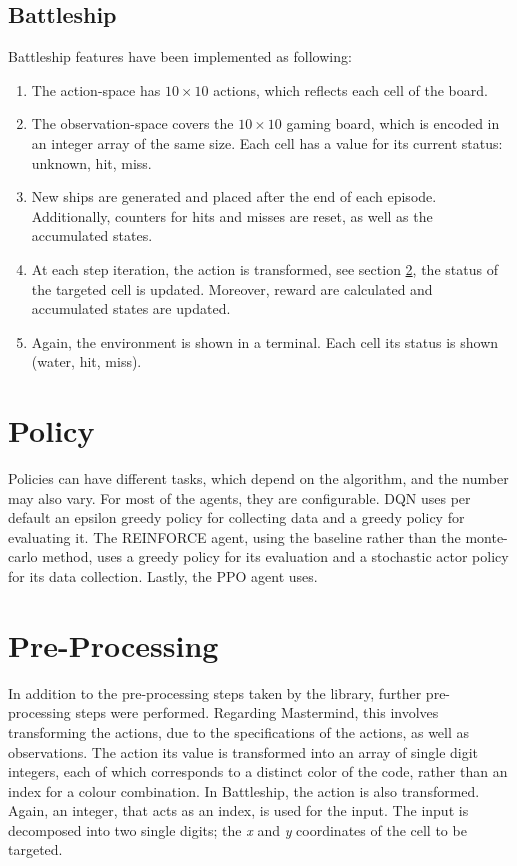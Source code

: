 \subsection{Battleship}
\label{ssec:Battleship}
Battleship features have been implemented as following:

\begin{enumerate}

	\item{The action-space has $10 \times 10$ actions, which reflects each cell of the board.}
	\item{The observation-space covers the $10 \times 10$ gaming board, which is encoded in an integer array of the same size. Each cell has a value for its current status: unknown, hit, miss. }
	\item{New ships are generated and placed after the end of each episode. Additionally, counters for hits and misses are reset, as well as the accumulated states.}
	\item{At each step iteration, the action is transformed, see section \ref{sec:preprocessing}, the status of the targeted cell is updated. Moreover, reward are calculated and accumulated states are updated.}
	\item{Again, the environment is shown in a terminal. Each cell its status is shown (water, hit, miss).}

\end{enumerate}

\section{Policy}
\label{sec:policy}
Policies can have different tasks, which depend on the algorithm, and the number may also vary. For most of the agents, they are configurable. DQN uses per default an epsilon greedy policy for collecting data and a greedy policy for evaluating it. The REINFORCE agent, using the baseline rather than the monte-carlo method, uses a greedy policy for its evaluation and a stochastic actor policy for its data collection. Lastly, the PPO agent uses.

\section{Pre-Processing}
\label{sec:preprocessing}
In addition to the pre-processing steps taken by the library, further pre-processing steps were performed. Regarding Mastermind, this involves transforming the actions, due to the specifications of the actions, as well as observations. The action its value is transformed into an array of single digit integers, each of which corresponds to a distinct color of the code, rather than an index for a colour combination. In Battleship, the action is also transformed. Again, an integer, that acts as an index, is used for the input. The input is decomposed into two single digits; the \textit{x} and \textit{y} coordinates of the cell to be targeted.


